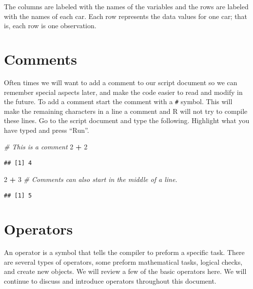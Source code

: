 \documentclass[
]{book}
\newenvironment{Shaded}{\begin{snugshade}}{\end{snugshade}}
\newcommand{\CommentTok}[1]{\textcolor[rgb]{0.56,0.35,0.01}{\textit{#1}}}
\newcommand{\DecValTok}[1]{\textcolor[rgb]{0.00,0.00,0.81}{#1}}
\newcommand{\OperatorTok}[1]{\textcolor[rgb]{0.81,0.36,0.00}{\textbf{#1}}}
\newcommand{\StringTok}[1]{\textcolor[rgb]{0.31,0.60,0.02}{#1}}
\begin{document}
The columns are labeled with the names of the variables and the rows are labeled with the names of each car. Each row represents the data values for one car; that is, each row is one observation.

\hypertarget{comments}{%
\section{Comments}\label{comments}}

Often times we will want to add a comment to our script document so we can remember special aspects later, and make the code easier to read and modify in the future. To add a comment start the comment with a \texttt{\#} symbol. This will make the remaining characters in a line a comment and R will not try to compile these lines. Go to the script document and type the following. Highlight what you have typed and press ``Run''.

\begin{Shaded}
\begin{Highlighting}[]
\CommentTok{# This is a comment}
\DecValTok{2} \OperatorTok{+}\StringTok{ }\DecValTok{2}
\end{Highlighting}
\end{Shaded}

\begin{verbatim}
## [1] 4
\end{verbatim}

\begin{Shaded}
\begin{Highlighting}[]
\DecValTok{2} \OperatorTok{+}\StringTok{ }\DecValTok{3}  \CommentTok{# Comments can also start in the middle of a line. }
\end{Highlighting}
\end{Shaded}

\begin{verbatim}
## [1] 5
\end{verbatim}

\hypertarget{operators}{%
\section{Operators}\label{operators}}

An operator is a symbol that tells the compiler to preform a specific task. There are several types of operators, some preform mathematical tasks, logical checks, and create new objects. We will review a few of the basic operators here. We will continue to discuss and introduce operators throughout this document.
\end{document}
